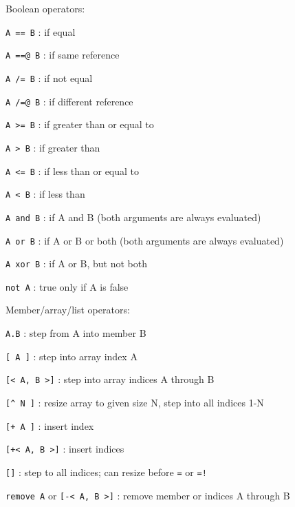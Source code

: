 \documentclass{article}
\begin{document}
\noindent
Boolean operators:
\begin{description}
\item{\verb#A == B#} :  if equal
\item{\verb#A ==@ B#} :  if same reference
\item{\verb#A /= B#} :  if not equal
\item{\verb#A /=@ B#} :  if different reference
\item{\verb#A >= B#} :  if greater than or equal to
\item{\verb#A > B#} :  if greater than
\item{\verb#A <= B#} :  if less than or equal to
\item{\verb#A < B#} :  if less than
\item{\verb#A and B#} :  if A and B (both arguments are always evaluated)
\item{\verb#A or B#} :  if A or B or both (both arguments are always evaluated)
\item{\verb#A xor B#} :  if A or B, but not both
\item{\verb#not A#} :  true only if A is false\\
\end{description}

\noindent
Member/array/list operators:
\begin{description}
\item{\verb#A.B#} :  step from A into member B
\item{\verb#[ A ]#} :  step into array index A
\item{\verb#[< A, B >]#} :  step into array indices A through B
\item{\verb#[^ N ]#} :  resize array to given size N, step into all indices 1-N
\item{\verb#[+ A ]#} :  insert index
\item{\verb#[+< A, B >]#} :  insert indices
\item{\verb#[]#} :  step to all indices; can resize before \verb#=# or \verb#=!#
\item{\verb#remove A#  or  \verb#[-< A, B >]#} :  remove member or indices A through B\\
\end{description}
\end{document}
